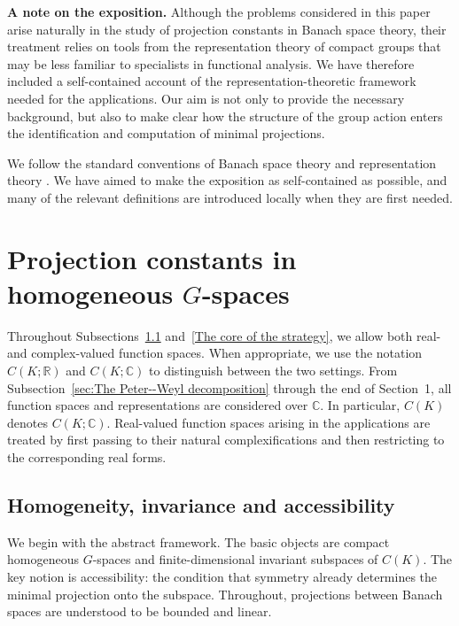 \documentclass[11pt,showkeys]{amsart}
\begin{document}
\medskip
\textbf{A note on the exposition.} Although the problems considered in this paper arise naturally in the study of projection constants in Banach space theory, their treatment relies on tools from the representation theory of compact groups that may be less familiar to specialists in functional analysis. We have therefore included a self-contained account of the representation-theoretic framework needed for the applications. Our aim is not only to provide the necessary background, but also to make clear how the structure of the group action enters the identification and computation of minimal projections.

We follow the standard conventions of Banach space theory \cite{wojtaszczyk1996banach}
and representation theory \cite{folland2016course}. We have aimed to make the exposition as self-contained as possible, and many
of the relevant definitions are introduced locally when they are first needed.
\medskip




\section{Projection constants in homogeneous $G$-spaces}
\label{sec:Projection constants}


Throughout Subsections~\ref{sec: homogeneity} and~\ref{The core of the strategy}, we allow both real- and
complex-valued function spaces. When appropriate, we use the notation
$C(K;\mathbb R)$ and $C(K;\mathbb C)$ to distinguish between the two
settings. From Subsection~\ref{sec:The Peter--Weyl decomposition}
through the end of Section~1, all function spaces and representations
are considered over $\mathbb C$. In particular, $C(K)$ denotes
$C(K;\mathbb C)$. Real-valued function spaces arising in the
applications are treated by first passing to their natural
complexifications and then restricting to the corresponding real
forms.

\subsection{Homogeneity, invariance and accessibility}\label{sec: homogeneity}
We begin with the abstract framework. The basic objects are compact
homogeneous \(G\)-spaces and finite-dimensional invariant subspaces of
\(C(K)\). The key notion is accessibility: the condition that symmetry
already determines the minimal projection onto the subspace. Throughout, projections between Banach spaces are understood to be bounded and linear.
\end{document}

